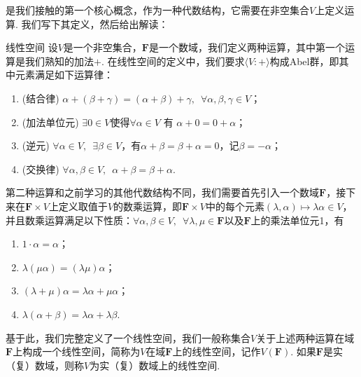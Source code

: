 是我们接触的第一个核心概念，作为一种代数结构，它需要在非空集合$V$上定义运算. 我们写下其定义，然后给出解读：
\begin{definition}{线性空间}{}
    设$V$是一个非空集合，$\mathbf{F}$是一个数域，我们定义两种运算，其中第一个运算是我们熟知的加法$+$. 在线性空间的定义中，我们要求$\langle V:+\rangle$构成Abel群，即其中元素满足如下运算律：
    \begin{enumerate}
        \item (结合律) $\alpha+(\beta+\gamma)=(\alpha+\beta)+\gamma,\enspace\forall \alpha,\beta,\gamma \in V$；

        \item (加法单位元) $\exists 0 \in V$使得$\forall\alpha\in V$ 有 $\alpha+0=0+\alpha$；

        \item (逆元) $\forall\alpha\in V,\enspace \exists \beta \in V$，有$\alpha+\beta=\beta+\alpha=0$，记$\beta=-\alpha$；

        \item (交换律) $\forall\alpha, \beta\in V,\enspace \alpha+\beta=\beta+\alpha$.
    \end{enumerate}

    第二种运算和之前学习的其他代数结构不同，我们需要首先引入一个数域$\mathbf{F}$，接下来在$\mathbf{F}\times V$上定义取值于$V$的数乘运算，即$\mathbf{F}\times V$中的每个元素$(\lambda,\alpha)\mapsto \lambda\alpha\in V$，并且数乘运算满足以下性质：$\forall \alpha,\beta \in V,\enspace\forall \lambda,\mu\in\mathbf{F}$以及$\mathbf{F}$上的乘法单位元1，有
    \begin{enumerate}
        \item $1\cdot \alpha=\alpha$；

        \item $\lambda(\mu\alpha)=(\lambda\mu)\alpha$；

        \item $(\lambda+\mu)\alpha=\lambda\alpha+\mu\alpha$；

        \item $\lambda(\alpha+\beta)=\lambda\alpha+\lambda\beta$.
    \end{enumerate}

    基于此，我们完整定义了一个线性空间，我们一般称集合$V$关于上述两种运算在域$\mathbf{F}$上构成一个线性空间，简称为$V$在域$\mathbf{F}$上的线性空间，记作$V(\mathbf{F})$. 如果$\mathbf{F}$是实（复）数域，则称$V$为实（复）数域上的线性空间.
\end{definition}
